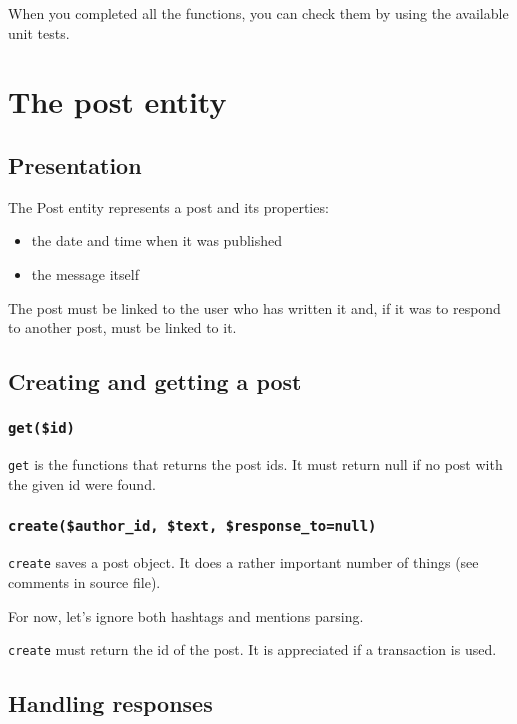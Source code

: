 \documentclass[twoside,a4paper,12pt]{article}
\begin{document}
When you completed all the functions, you can check them by using the available unit tests.

\section{The post entity}

\subsection{Presentation}

The Post entity represents a post and its properties:

\begin{itemize}
\item the date and time when it was published
\item the message itself
\end{itemize}

The post must be linked to the user who has written it and, if it was to respond to another post, must be linked to it.

\subsection{Creating and getting a post}

\subsubsection{\texttt{get(\$id)}}

\texttt{get} is the functions that returns the post ids. It must return null if no post with the given id were found.

\subsubsection{\texttt{create(\$author\_id, \$text, \$response\_to=null)}}

\texttt{create} saves a post object. It does a rather important number of things (see comments in source file).

For now, let's ignore both hashtags and mentions parsing.

\texttt{create} must return the id of the post. It is appreciated if a transaction is used.

\subsection{Handling responses}
\end{document}
